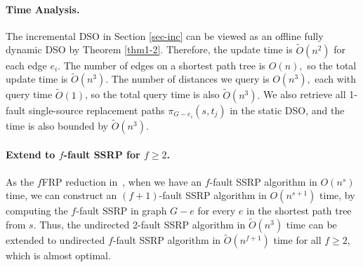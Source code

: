 \documentclass[11pt]{article}
\theoremstyle{plain}
\theoremstyle{definition}
\newcommand{\too}[1]{\tilde{O}({#1})}
\newcommand{\og}[3]{\pi_{G-#3}\left(#1,#2\right)}
\begin{document}
\paragraph{Time Analysis.}

The incremental DSO in Section \ref{sec-inc} can be viewed as an offline fully dynamic DSO by Theorem \ref{thm1-2}. Therefore, the update time is $\too{n^2}$ for each edge $e_i.$ The number of edges on a shortest path tree is $O(n),$ so the total update time is $\too{n^3}.$ The number of distances we query is $O(n^3),$ each with query time $\too{1}$, so the total query time is also $\too{n^3}.$ We also retrieve all 1-fault single-source replacement paths $\og{s}{t_j}{e_i}$ in the static DSO, and the time is also bounded by $\too{n^3}.$

\paragraph{Extend to $f$-fault SSRP for $f\geq 2$.}

As the $f$FRP reduction in~\cite{WWX22}, when we have an $f$-fault SSRP algorithm in $O(n^s)$ time, we can construct an $(f+1)$-fault SSRP algorithm in $O(n^{s+1})$ time, by computing the $f$-fault SSRP in graph $G-e$ for every $e$ in the shortest path tree from $s$. Thus, the undirected 2-fault SSRP algorithm in $\tilde{O}(n^3)$ time can be extended to undirected $f$-fault SSRP algorithm in $\tilde{O}(n^{f+1})$ time for all $f\geq 2$, which is almost optimal. 





\vspace{5mm}


\end{document}
